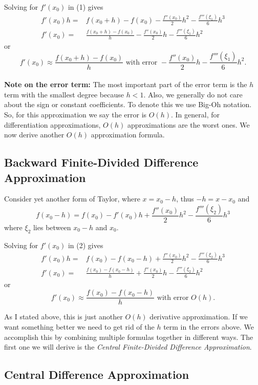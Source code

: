 \documentclass [titlepage,12pt,letter] {article}
\begin{document}
Solving for $f'(x_0)$ in (1) gives
\begin{align*}
f'(x_0)h =& f(x_0+h) - f(x_0) - \frac{f''(x_0)}{2}h^2 - \frac{f'''(\xi_1)}{6}h^3 \\
f'(x_0) =& \frac{f(x_0+h) - f(x_0)}{h}  - \frac{f''(x_0)}{2}h - \frac{f'''(\xi_1)}{6}h^2
\end{align*}
or
\[
\boxed{f'(x_0) \approx \frac{f(x_0+h) - f(x_0)}{h}} \text{ with error } - \frac{f''(x_0)}{2}h - \frac{f'''(\xi_1)}{6}h^2.
\]
\\
{\bf Note on the error term:} The most important part of the error term is the $h$ term with the smallest degree because $h<1$. Also, we generally do not care about the sign or constant coefficients. To denote this we use Big-Oh notation. So, for this approximation we say the error is $O(h)$. In general, for differentiation approximations, $O(h)$ approximations are the worst ones. We now derive another $O(h)$ approximation formula.

\subsection{Backward Finite-Divided Difference Approximation}

Consider yet another form of Taylor, where $x=x_0-h$, thus $-h=x-x_0$ and
\begin{equation}
f(x_0-h) = f(x_0) - f'(x_0)h + \frac{f''(x_0)}{2}h^2 - \frac{f'''(\xi_2)}{6}h^3
\end{equation}
where $\xi_2$ lies between $x_0-h$ and $x_0$.

Solving for $f'(x_0)$ in (2) gives
\begin{align*}
f'(x_0)h =& f(x_0) - f(x_0-h) + \frac{f''(x_0)}{2}h^2 - \frac{f'''(\xi_2)}{6}h^3 \\
f'(x_0) =& \frac{f(x_0) - f(x_0-h)}{h} + \frac{f''(x_0)}{2}h - \frac{f'''(\xi_2)}{6}h^2
\end{align*}
or
\[
\boxed{f'(x_0) \approx \frac{f(x_0) - f(x_0-h)}{h}} \text{ with error } O(h).
\]

As I stated above, this is just another $O(h)$ derivative approximation. If we want something better we need to get rid of the $h$ term in the errors above. We accomplish this by combining multiple formulas together in different ways. The first one we will derive is the {\it Central Finite-Divided Difference Approximation}.

\subsection{Central Difference Approximation}
\end{document}
